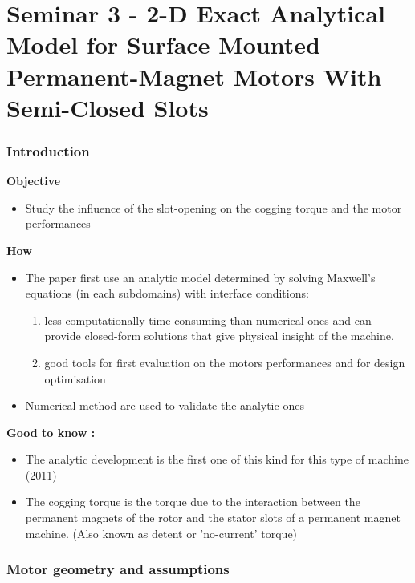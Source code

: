 \part{Seminar 3 - 2-D Exact Analytical Model for Surface Mounted Permanent-Magnet Motors With Semi-Closed Slots}


\section{Introduction}
\textbf{Objective}
\begin{itemize}
    \item Study the influence of the slot-opening on the cogging torque and the motor performances
\end{itemize}   

\textbf{How}
\begin{itemize}
    \item The paper first use an analytic model determined by solving Maxwell's equations (in each subdomains) with interface conditions:
         \begin{enumerate}
             \item less computationally time consuming than numerical ones and can provide closed-form solutions that give physical insight of the machine.
             \item good tools for first evaluation on the motors performances and for design optimisation
         \end{enumerate}
    \item Numerical method are used to validate the analytic ones
\end{itemize}

\textbf{Good to know :} 
\begin{itemize}
\item The analytic development is the first one of this kind for this type of machine (2011)
\item The cogging torque is the torque due to the interaction between the permanent magnets of the rotor and the stator slots of a permanent magnet machine. (Also known as detent or 'no-current' torque)
\end{itemize}


\section{Motor geometry and assumptions}

